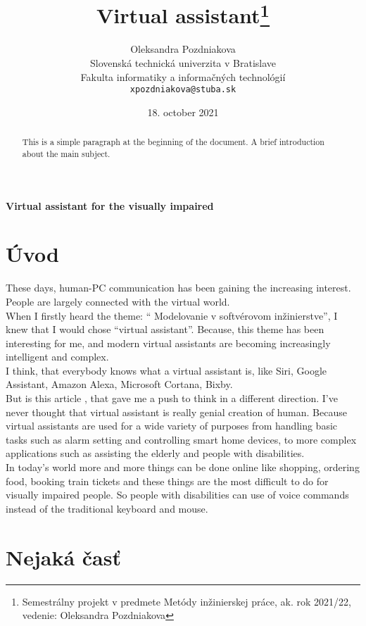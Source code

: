\documentclass[10pt,twoside,slovak,a4paper]{article}
\title{Virtual assistant\thanks{Semestrálny projekt v predmete Metódy inžinierskej práce, ak. rok 2021/22, vedenie: Oleksandra Pozdniakova}} %
\author{Oleksandra Pozdniakova\\[2pt]
	{\small Slovenská technická univerzita v Bratislave}\\
	{\small Fakulta informatiky a informačných technológií}\\
	{\small \texttt{xpozdniakova@stuba.sk}}
	}
\date{\small 18. october 2021} %
\begin{document}
\maketitle
\begin{center}
\textbf{Virtual assistant for the visually impaired}
\end{center}

\begin{abstract}
This is a simple paragraph at the beginning of the 
document. A brief introduction about the main subject.
\end{abstract}

\section{Úvod}
These days, human-PC communication has been gaining the increasing interest. People are largely connected with the virtual world.\\

When I firstly heard the theme: “ Modelovanie v softvérovom inžinierstve”, I knew that I would chose “virtual assistant”. Because, this theme has been interesting for me, and modern virtual assistants are becoming increasingly intelligent and complex.\\

I think, that everybody knows what a virtual assistant is, like Siri, Google Assistant, Amazon Alexa, Microsoft Cortana, Bixby.\\

But is this article \href{https://ieeexplore.ieee.org/document/9137874}, that gave me a push to think in a different direction. I’ve never thought that virtual assistant is really genial creation of human. Because virtual assistants are used for a wide variety of purposes from handling basic tasks such as alarm setting and controlling smart home devices, to more complex applications such as assisting the elderly and people with disabilities.\\

In today's world more and more things can be done online like shopping, ordering food, booking train tickets and these things are the most difficult to do for visually impaired people. So people with disabilities can use of voice commands instead of the traditional keyboard and mouse.




\section{Nejaká časť} \label{nejaka}
\end{document}
